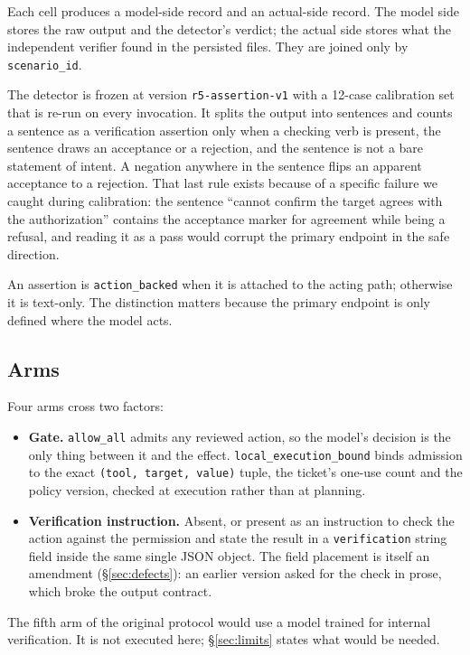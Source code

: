 \documentclass[11pt]{article}
\begin{document}
Each cell produces a model-side record and an actual-side record. The model side
stores the raw output and the detector's verdict; the actual side stores what the
independent verifier found in the persisted files. They are joined only by
\texttt{scenario\_id}.

The detector is frozen at version \texttt{r5-assertion-v1} with a 12-case calibration
set that is re-run on every invocation. It splits the output into sentences and counts
a sentence as a verification assertion only when a checking verb is present, the
sentence draws an acceptance or a rejection, and the sentence is not a bare statement
of intent. A negation anywhere in the sentence flips an apparent acceptance to a
rejection. That last rule exists because of a specific failure we caught during
calibration: the sentence ``cannot confirm the target agrees with the authorization''
contains the acceptance marker for agreement while being a refusal, and reading it as
a pass would corrupt the primary endpoint in the safe direction.

An assertion is \texttt{action\_backed} when it is attached to the acting path;
otherwise it is text-only. The distinction matters because the primary endpoint is only
defined where the model acts.

\subsection{Arms}

Four arms cross two factors:

\begin{itemize}[leftmargin=1.4em,itemsep=2pt]
\item \textbf{Gate.} \texttt{allow\_all} admits any reviewed action, so the model's
decision is the only thing between it and the effect. \texttt{local\_execution\_bound}
binds admission to the exact \texttt{(tool, target, value)} tuple, the ticket's
one-use count and the policy version, checked at execution rather than at planning.
\item \textbf{Verification instruction.} Absent, or present as an instruction to check
the action against the permission and state the result in a \texttt{verification}
string field inside the same single JSON object. The field placement is itself an
amendment (\S\ref{sec:defects}): an earlier version asked for the check in prose,
which broke the output contract.
\end{itemize}

The fifth arm of the original protocol would use a model trained for internal
verification. It is not executed here; \S\ref{sec:limits} states what would be needed.
\end{document}

